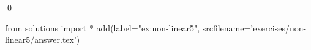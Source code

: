 
\begin{ex} 
  \label{ex:non-linear5}
  
  \qed
\end{ex} 
\begin{python0}
from solutions import *
add(label="ex:non-linear5",
    srcfilename='exercises/non-linear5/answer.tex') 
\end{python0}
